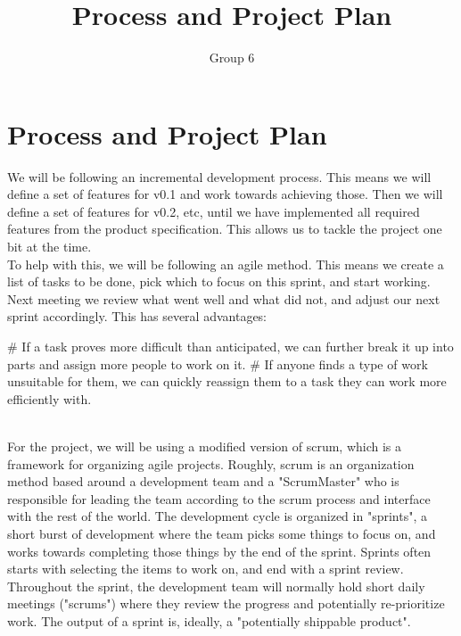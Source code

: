 \documentclass{article}
\title{Process and Project Plan}
\author{Group 6}
\begin{document}
\maketitle

\section*{Process and Project Plan}

We will be following an incremental development process. This means we will define a set of features for v0.1 and work towards achieving those. Then we will define a set of features for v0.2, etc, until we have implemented all required features from the product specification. This allows us to tackle the project one bit at the time.\\

To help with this, we will be following an agile method. This means we create a list of tasks to be done, pick which to focus on this sprint, and start working. Next meeting we review what went well and what did not, and adjust our next sprint accordingly. This has several advantages:\\

\begin{easylist}[enumerate]
    # If a task proves more difficult than anticipated, we can further break it up into parts and assign more people to work on it.
    # If anyone finds a type of work unsuitable for them, we can quickly reassign them to a task they can work more efficiently with.
\end{easylist}\mbox{}\\

For the project, we will be using a modified version of scrum, which is a framework for organizing agile projects. Roughly, scrum is an organization method based around a development team and a "ScrumMaster" who is responsible for leading the team according to the scrum process and interface with the rest of the world. The development cycle is organized in "sprints", a short burst of development where the team picks some things to focus on, and works towards completing those things by the end of the sprint. Sprints often starts with selecting the items to work on, and end with a sprint review. Throughout the sprint, the development team will normally hold short daily meetings ("scrums") where they review the progress and potentially re-prioritize work. The output of a sprint is, ideally, a "potentially shippable product".\\
\end{document}
